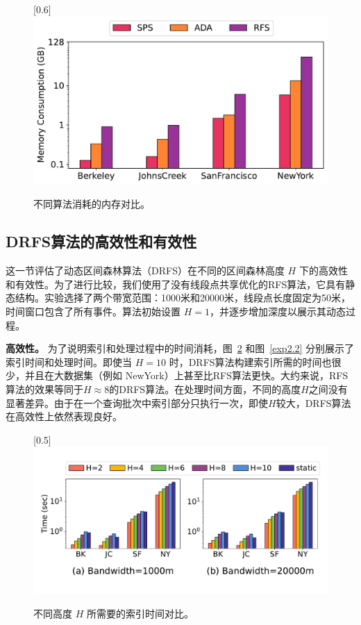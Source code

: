 \begin{figure}[h]\centering
	\scalebox{0.6}[0.6]{\includegraphics{./figures/EXP_Memory.pdf}}
	\caption{不同算法消耗的内存对比。}
	\label{exp1.5}
\end{figure}


\subsection{DRFS算法的高效性和有效性}

这一节评估了动态区间森林算法（DRFS）在不同的区间森林高度 $H$ 下的高效性和有效性。为了进行比较，我们使用了没有线段点共享优化的RFS算法，它具有静态结构。实验选择了两个带宽范围：1000米和20000米，线段点长度固定为50米，时间窗口包含了所有事件。算法初始设置 $H=1$，并逐步增加深度以展示其动态过程。

\textbf{高效性。} 为了说明索引和处理过程中的时间消耗，图~\ref{exp2.1} 和图~\ref{exp2.2} 分别展示了索引时间和处理时间。即使当 $H=10$ 时，DRFS算法构建索引所需的时间也很少，并且在大数据集（例如 NewYork）上甚至比RFS算法更快。大约来说，RFS算法的效果等同于$H \approx 8$的DRFS算法。在处理时间方面，不同的高度$H$之间没有显著差异。由于在一个查询批次中索引部分只执行一次，即使$H$较大，DRFS算法在高效性上依然表现良好。

\begin{figure}[h]\centering
	\scalebox{0.5}[0.5]{\includegraphics{./figures/EXP_H_PrepareTime.pdf}}
	\vspace{-1em}
	\caption{不同高度 $H$ 所需要的索引时间对比。}
	\label{exp2.1}
\end{figure}

